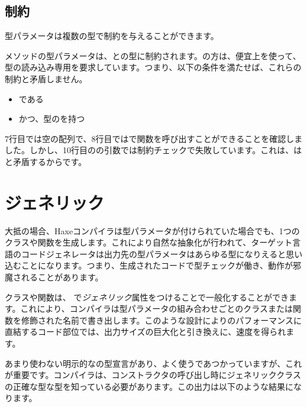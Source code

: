 \subsection{制約}
\label{type-system-type-parameter-constraints}

型パラメータは複数の型で制約を与えることができます。


メソッドの型パラメータは、との型に制約されます。の方は、便宜上を使って、型の読み込み専用を要求しています。つまり、以下の条件を満たせば、これらの制約と矛盾しません。

\begin{itemize}
	\item {}である
	\item かつ、型のを持つ
\end{itemize}

7行目では空の配列で、8行目ではで関数を呼び出すことができることを確認しました。しかし、10行目のの引数では制約チェックで失敗しています。これは、はと矛盾するからです。

\section{ジェネリック}
\label{type-system-generic}

大抵の場合、Haxeコンパイラは型パラメータが付けられていた場合でも、1つのクラスや関数を生成します。これにより自然な抽象化が行われて、ターゲット言語のコードジェネレータは出力先の型パラメータはあらゆる型になりえると思い込むことになります。つまり、生成されたコードで型チェックが働き、動作が邪魔されることがあります。

クラスや関数は、 で\emph{ジェネリック}属性をつけることで一般化することができます。これにより、コンパイラは型パラメータの組み合わせごとのクラスまたは関数を修飾された名前で書き出します。このような設計によりのパフォーマンスに直結するコード部位では、出力サイズの巨大化と引き換えに、速度を得られます。


あまり使わない明示的なの型宣言があり、よく使うであつかっていますが、これが重要です。コンパイラは、コンストラクタの呼び出し時にジェネリッククラスの正確な型な型を知っている必要があります。この出力は以下のような結果になります。

